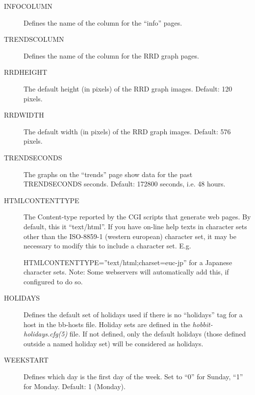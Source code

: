 \begin{description}
 

\item[INFOCOLUMN] Defines the name of the column for the ``info'' pages. 

 

\item[TRENDSCOLUMN] Defines the name of the column for the RRD graph pages. 

 

\item[RRDHEIGHT] The default height (in pixels) of the RRD graph images. Default: 120 pixels. 

 

\item[RRDWIDTH] The default width (in pixels) of the RRD graph images. Default: 576 pixels. 

 

\item[TRENDSECONDS] The graphs on the ``trends'' page show data for the past TRENDSECONDS seconds. Default: 172800 seconds, i.e. 48 hours. 

 

\item[HTMLCONTENTTYPE] The Content-type reported by the CGI scripts that generate web pages. By default, this it ``text/html''. If you have on-line help texts in character sets other than the ISO-8859-1 (western european) character set, it may be necessary to modify this to include a character set. E.g.  
 
HTMLCONTENTTYPE=''text/html;charset=euc-jp''  
 for a Japanese character sets. Note: Some webservers will automatically add this, if configured to do so. 

 

\item[HOLIDAYS] Defines the default set of holidays used if there is no ``holidays'' tag for a host in the bb-hosts file. Holiday sets are defined in the \emph{hobbit-holidays.cfg(5)}
 file. If not defined, only the default holidays (those defined outside a named holiday set) will be considered as holidays. 

 

\item[WEEKSTART] Defines which day is the first day of the week. Set to ``0'' for Sunday, ``1'' for Monday. Default: 1 (Monday). 

 


 


\end{description}

